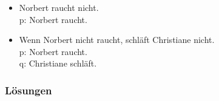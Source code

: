{\begin{frame}
\begin{table}
\begin{minipage}{0.3\textwidth}
\centering
\begin{itemize}
\item[] \small{Norbert raucht nicht.\\
               p: Norbert raucht.}
\end{itemize}
\end{minipage}
%
\begin{minipage}{0.65\textwidth}
\centering
\begin{itemize}
\item[] \small{Wenn Norbert nicht raucht, schläft Christiane nicht.\\
               p: Norbert raucht.\\
               q: Christiane schläft.}
\end{itemize}
\end{minipage}
\end{table}

\end{frame}

%

\begin{frame}
\frametitle{Lösungen}

\begin{table}


\end{table}
\end{frame}}
